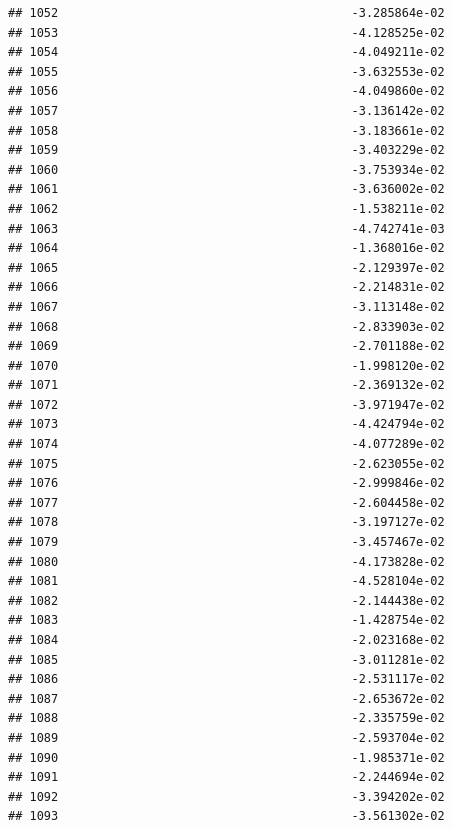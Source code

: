 \documentclass[
]{article}
\begin{document}
\begin{verbatim}
## 1052                                         -3.285864e-02
## 1053                                         -4.128525e-02
## 1054                                         -4.049211e-02
## 1055                                         -3.632553e-02
## 1056                                         -4.049860e-02
## 1057                                         -3.136142e-02
## 1058                                         -3.183661e-02
## 1059                                         -3.403229e-02
## 1060                                         -3.753934e-02
## 1061                                         -3.636002e-02
## 1062                                         -1.538211e-02
## 1063                                         -4.742741e-03
## 1064                                         -1.368016e-02
## 1065                                         -2.129397e-02
## 1066                                         -2.214831e-02
## 1067                                         -3.113148e-02
## 1068                                         -2.833903e-02
## 1069                                         -2.701188e-02
## 1070                                         -1.998120e-02
## 1071                                         -2.369132e-02
## 1072                                         -3.971947e-02
## 1073                                         -4.424794e-02
## 1074                                         -4.077289e-02
## 1075                                         -2.623055e-02
## 1076                                         -2.999846e-02
## 1077                                         -2.604458e-02
## 1078                                         -3.197127e-02
## 1079                                         -3.457467e-02
## 1080                                         -4.173828e-02
## 1081                                         -4.528104e-02
## 1082                                         -2.144438e-02
## 1083                                         -1.428754e-02
## 1084                                         -2.023168e-02
## 1085                                         -3.011281e-02
## 1086                                         -2.531117e-02
## 1087                                         -2.653672e-02
## 1088                                         -2.335759e-02
## 1089                                         -2.593704e-02
## 1090                                         -1.985371e-02
## 1091                                         -2.244694e-02
## 1092                                         -3.394202e-02
## 1093                                         -3.561302e-02

\end{verbatim}
\end{document}
